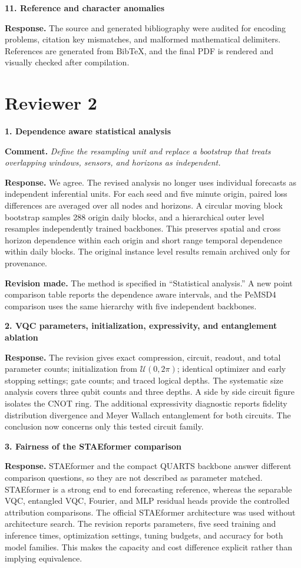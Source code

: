 \documentclass[11pt]{article}
\newcommand{\comment}[1]{\textbf{Comment.} \emph{#1}}
\newcommand{\response}[1]{\textbf{Response.} #1}
\newcommand{\change}[1]{\textbf{Revision made.} #1}
\begin{document}
\textbf{11. Reference and character anomalies}

\response{The source and generated bibliography were audited for encoding problems, citation key mismatches, and malformed mathematical delimiters. References are generated from BibTeX, and the final PDF is rendered and visually checked after compilation.}

\section*{Reviewer 2}

\textbf{1. Dependence aware statistical analysis}

\comment{Define the resampling unit and replace a bootstrap that treats overlapping windows, sensors, and horizons as independent.}

\response{We agree. The revised analysis no longer uses individual forecasts as independent inferential units. For each seed and five minute origin, paired loss differences are averaged over all nodes and horizons. A circular moving block bootstrap samples 288 origin daily blocks, and a hierarchical outer level resamples independently trained backbones. This preserves spatial and cross horizon dependence within each origin and short range temporal dependence within daily blocks. The original instance level results remain archived only for provenance.}

\change{The method is specified in ``Statistical analysis.'' A new point comparison table reports the dependence aware intervals, and the PeMSD4 comparison uses the same hierarchy with five independent backbones.}

\textbf{2. VQC parameters, initialization, expressivity, and entanglement ablation}

\response{The revision gives exact compression, circuit, readout, and total parameter counts; initialization from $\mathcal{U}(0,2\pi)$; identical optimizer and early stopping settings; gate counts; and traced logical depths. The systematic size analysis covers three qubit counts and three depths. A side by side circuit figure isolates the CNOT ring. The additional expressivity diagnostic reports fidelity distribution divergence and Meyer Wallach entanglement for both circuits. The conclusion now concerns only this tested circuit family.}

\textbf{3. Fairness of the STAEformer comparison}

\response{STAEformer and the compact QUARTS backbone answer different comparison questions, so they are not described as parameter matched. STAEformer is a strong end to end forecasting reference, whereas the separable VQC, entangled VQC, Fourier, and MLP residual heads provide the controlled attribution comparisons. The official STAEformer architecture was used without architecture search. The revision reports parameters, five seed training and inference times, optimization settings, tuning budgets, and accuracy for both model families. This makes the capacity and cost difference explicit rather than implying equivalence.}
\end{document}
